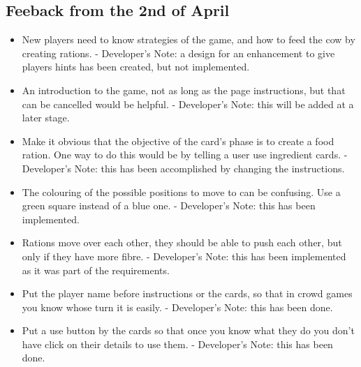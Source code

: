 \subsection{Feeback from the 2nd of April}
\begin{itemize}
	\item New players need to know strategies of the game, and how to feed the cow by creating rations. - Developer's Note: a design for an enhancement to give players hints has been created, but not implemented.
	\item An introduction to the game, not as long as the page instructions, but that can be cancelled would be helpful. - Developer's Note: this will be added at a later stage.
	\item Make it obvious that the objective of the card's phase is to create a food ration. One way to do this would be by telling a user use ingredient cards. - Developer's Note: this has been accomplished by changing the instructions.
	\item The colouring of the possible positions to move to can be confusing. Use a green square instead of a blue one. - Developer's Note: this has been implemented.
	\item Rations move over each other, they should be able to push each other, but only if they have more fibre. - Developer's Note: this has been implemented as it was part of the requirements.
	\item Put the player name before instructions or the cards, so that in crowd games you know whose turn it is easily. - Developer's Note: this has been done.
	\item Put a use button by the cards so that once you know what they do you don't have click on their details to use them. - Developer's Note: this has been done.
\end{itemize}

